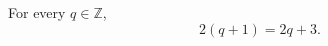 \documentclass{article}
\begin{document}
\begin{conjecture}\label{train:false}
For every $q\in\mathbb{Z}$,
\[2(q+1)=2q+3.\]
\end{conjecture}
\end{document}
